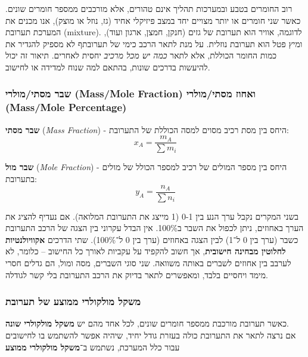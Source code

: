 \documentclass[
  hebrew,
  letterpaper,
  DIV=11,
  numbers=noendperiod]{scrreprt}
\begin{document}
{רוב החומרים בטבע ובמערכות תהליך אינם טהורים, אלא מורכבים ממספר חומרים
שונים}. {כאשר שני חומרים או יותר מצויים יחד במצב פיזיקלי אחיד (גז, נוזל
או מוצק), אנו מכנים את המערכת תערובת} (mixture){. לדוגמה, אוויר הוא
תערובת של גזים (חנקן, חמצן, ארגון ועוד), ומיץ פטל הוא תערובת נוזלית}.
{על מנת לתאר הרכב כימי של תערובתף לא מספיק להגדיר את כמות החומר הכוללת,
אלא לתאר \emph{כמה יש מכל מרכיב} יחסית לאחרים}. {תיאור זה יכול להיעשות
בדרכים שונות, בהתאם למה שנוח למדידה או לחישוב}.

\subsubsection{\texorpdfstring{{שבר מסתי/מולרי (Mass/Mole Fraction)
ואחוז מסתי/מולרי (Mass/Mole
Percentage)}}{שבר מסתי/מולרי (Mass/Mole Fraction) ואחוז מסתי/מולרי (Mass/Mole Percentage)}}\label{ux5e9ux5d1ux5e8-ux5deux5e1ux5eaux5d9ux5deux5d5ux5dcux5e8ux5d9-massmole-fraction-ux5d5ux5d0ux5d7ux5d5ux5d6-ux5deux5e1ux5eaux5d9ux5deux5d5ux5dcux5e8ux5d9-massmole-percentage}

\textbf{שבר מסתי} (\emph{Mass Fraction}) - היחס בין מסת רכיב מסוים למסה
הכוללת של התערובת: \[
x_{A} = \frac{m_{A}}{\sum m_{i}}
\]

\textbf{שבר מול} (\emph{Mole Fraction}) - היחס בין מספר המולים של רכיב
למספר הכולל של מולים בתערובת: \[
y_{A} = \frac{n_{A}}{\sum n_{i}}
\]

{בשני המקרים נקבל ערך הנע בין 0-1 (1 מייצג את התערובת המלואה). אם נעדיף
להציג את הערך באחוזים, ניתן לכפול את השבר ב100\%. אין הבדל עקרוני בין
הצגה של הרכב התערובת כשבר (ערך בין 0 ל־1) לבין הצגה באחוזים (ערך בין 0
ל־100\%). שתי הדרכים \textbf{אקוויולנטיות לחלוטין מבחינה חישובית}}, {אך
חשוב להקפיד על עקביות לאורך כל החישוב -- כלומר, לא לערבב בין אחוזים
לשברים באותה משוואה}. {שני סוגי השברים, מסה ומול, הם גדלים חסרי מימד
ויחסיים בלבד, ומאפשרים לתאר בדיוק את הרכב התערובת בלי קשר לגודלה}.

\subsubsection{\texorpdfstring{{משקל מולקולרי ממוצע של
תערובת}}{משקל מולקולרי ממוצע של תערובת}}\label{ux5deux5e9ux5e7ux5dc-ux5deux5d5ux5dcux5e7ux5d5ux5dcux5e8ux5d9-ux5deux5deux5d5ux5e6ux5e2-ux5e9ux5dc-ux5eaux5e2ux5e8ux5d5ux5d1ux5ea}

{כאשר תערובת מורכבת ממספר חומרים שונים, לכל אחד מהם יש \textbf{משקל
מולקולרי שונה}}.\\
{אם נרצה לתאר את התערובת כולה בעזרת גודל יחיד, שיהיה אפשר להשתמש בו
לחישובים עבור כלל המערכת, נשתמש ב־\textbf{משקל מולקולרי ממוצע}}
\end{document}
